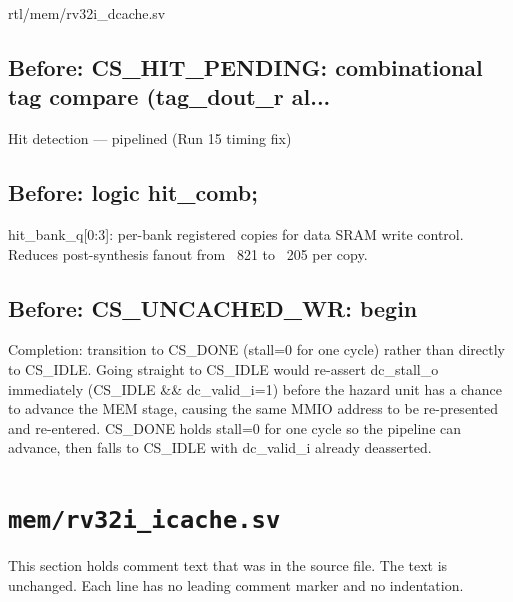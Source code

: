 \begin{relocated}{rtl/mem/rv32i_dcache.sv}

\subsection*{Before: CS\_HIT\_PENDING: combinational tag compare (tag\_dout\_r al...}

\begin{textblock}
Hit detection — pipelined (Run 15 timing fix)
\end{textblock}

\subsection*{Before: logic hit\_comb;}

\begin{textblock}
hit_bank_q[0:3]: per-bank registered copies for data SRAM write control.
Reduces post-synthesis fanout from ~821 to ~205 per copy.
\end{textblock}

\subsection*{Before: CS\_UNCACHED\_WR: begin}

\begin{textblock}
Completion: transition to CS_DONE (stall=0 for one cycle) rather
than directly to CS_IDLE.  Going straight to CS_IDLE would re-assert
dc_stall_o immediately (CS_IDLE && dc_valid_i=1) before the hazard
unit has a chance to advance the MEM stage, causing the same MMIO
address to be re-presented and re-entered.  CS_DONE holds stall=0
for one cycle so the pipeline can advance, then falls to CS_IDLE
with dc_valid_i already deasserted.
\end{textblock}

\end{relocated}

\section{\texttt{mem/rv32i\_icache.sv}}\label{tm:mod:rv32i-icache}

This section holds comment text that was in the source file. The text is unchanged. Each line has no leading comment marker and no indentation.


